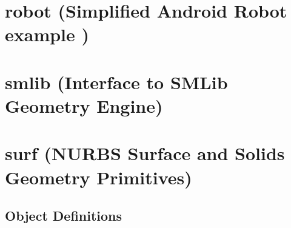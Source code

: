 \documentclass [11pt]{book}
\begin{document}
\section{robot (Simplified Android Robot example )}

\label{sec:robot(simplifiedandroidrobotexample)}







\section{smlib (Interface to SMLib Geometry Engine)}

\label{sec:smlib(interfacetosmlibgeometryengine)}







\section{surf (NURBS Surface and Solids Geometry Primitives)}

\label{sec:surf(nurbssurfaceandsolidsgeometryprimitives)}





\subsection{Object Definitions}

\label{subsec:objectdefinitions}
\end{document}

